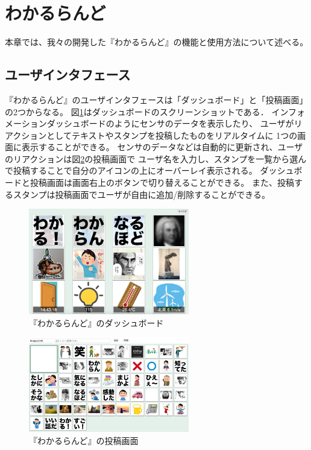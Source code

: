 \section{わかるらんど}
本章では、我々の開発した『わかるらんど』の機能と使用方法について述べる。

\subsection{ユーザインタフェース}
『わかるらんど』のユーザインタフェースは「ダッシュボード」と「投稿画面」の2つからなる。
図\ref{dashboard}はダッシュボードのスクリーンショットである．
インフォメーションダッシュボードのようにセンサのデータを表示したり、
ユーザがリアクションとしてテキストやスタンプを投稿したものをリアルタイムに
1つの画面に表示することができる。
センサのデータなどは自動的に更新され、ユーザのリアクションは図\ref{console}の投稿画面で
ユーザ名を入力し、スタンプを一覧から選んで投稿することで自分のアイコンの上にオーバーレイ表示される。
ダッシュボードと投稿画面は画面右上のボタンで切り替えることができる。
また、投稿するスタンプは投稿画面でユーザが自由に追加/削除することができる。

\begin{figure}[h]
\centering
\includegraphics[width=7cm]{images/dashboard.png}
\caption{『わかるらんど』のダッシュボード}
\label{dashboard}
\end{figure}

\begin{figure}[h]
\centering
\includegraphics[width=7cm]{images/console.png}
\caption{『わかるらんど』の投稿画面}
\label{console}
\end{figure}

